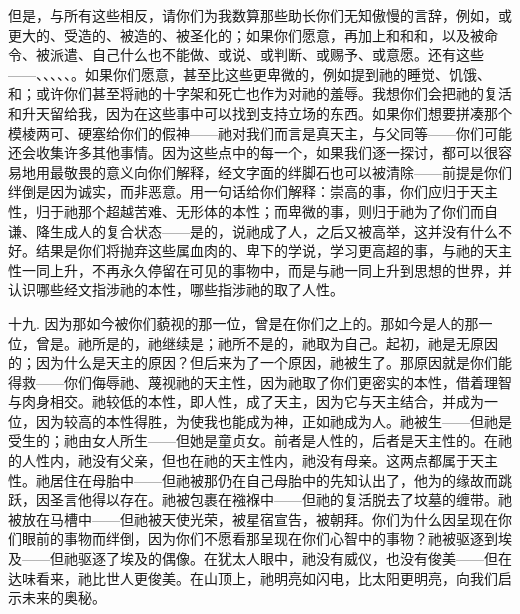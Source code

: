 但是，与所有这些相反，请你们为我数算那些助长你们无知傲慢的言辞，例如，或更大的、受造的、被造的、被圣化的；如果你们愿意，再加上和和和，以及被命令、被派遣、自己什么也不能做、或说、或判断、或赐予、或意愿。还有这些——、、、、、。如果你们愿意，甚至比这些更卑微的，例如提到祂的睡觉、饥饿、和；或许你们甚至将祂的十字架和死亡也作为对祂的羞辱。我想你们会把祂的复活和升天留给我，因为在这些事中可以找到支持立场的东西。如果你们想要拼凑那个模棱两可、硬塞给你们的假神——祂对我们而言是真天主，与父同等——你们可能还会收集许多其他事情。因为这些点中的每一个，如果我们逐一探讨，都可以很容易地用最敬畏的意义向你们解释，经文字面的绊脚石也可以被清除——前提是你们绊倒是因为诚实，而非恶意。用一句话给你们解释：崇高的事，你们应归于天主性，归于祂那个超越苦难、无形体的本性；而卑微的事，则归于祂为了你们而自谦、降生成人的复合状态——是的，说祂成了人，之后又被高举，这并没有什么不好。结果是你们将抛弃这些属血肉的、卑下的学说，学习更高超的事，与祂的天主性一同上升，不再永久停留在可见的事物中，而是与祂一同上升到思想的世界，并认识哪些经文指涉祂的本性，哪些指涉祂的取了人性。\par

十九. 因为那如今被你们藐视的那一位，曾是在你们之上的。那如今是人的那一位，曾是。祂所是的，祂继续是；祂所不是的，祂取为自己。起初，祂是无原因的；因为什么是天主的原因？但后来为了一个原因，祂被生了。那原因就是你们能得救——你们侮辱祂、蔑视祂的天主性，因为祂取了你们更密实的本性，借着理智与肉身相交。祂较低的本性，即人性，成了天主，因为它与天主结合，并成为一位，因为较高的本性得胜，为使我也能成为神，正如祂成为人。祂被生——但祂是受生的；祂由女人所生——但她是童贞女。前者是人性的，后者是天主性的。在祂的人性内，祂没有父亲，但也在祂的天主性内，祂没有母亲。这两点都属于天主性。祂居住在母胎中——但祂被那仍在自己母胎中的先知认出了，他为的缘故而跳跃，因圣言他得以存在。祂被包裹在襁褓中——但祂的复活脱去了坟墓的缠带。祂被放在马槽中——但祂被天使光荣，被星宿宣告，被朝拜。你们为什么因呈现在你们眼前的事物而绊倒，因为你们不愿看那呈现在你们心智中的事物？祂被驱逐到埃及——但祂驱逐了埃及的偶像。在犹太人眼中，祂没有威仪，也没有俊美——但在达味看来，祂比世人更俊美。在山顶上，祂明亮如闪电，比太阳更明亮，向我们启示未来的奥秘。\par

